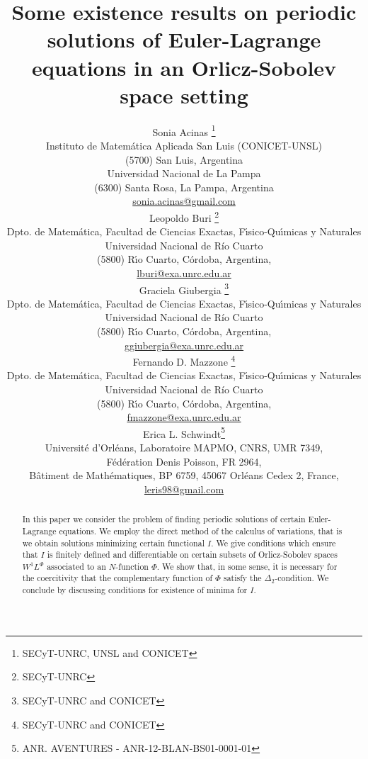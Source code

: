 \documentclass[twoside]{article}
\title{Some existence results on periodic solutions of 
Euler-Lagrange equations in an Orlicz-Sobolev space setting}
\author{Sonia Acinas \thanks{SECyT-UNRC, UNSL and CONICET}\\
Instituto de Matem\'atica Aplicada San Luis (CONICET-UNSL)\\
(5700) San Luis, Argentina\\
Universidad Nacional de La Pampa\\
(6300) Santa Rosa, La Pampa, Argentina\\
\url{sonia.acinas@gmail.com}\\[3mm]
Leopoldo Buri \thanks{SECyT-UNRC}\\
Dpto. de Matem\'atica, Facultad de Ciencias Exactas, F\'{\i}sico-Qu\'{\i}micas y Naturales\\
Universidad Nacional de R\'{i}o Cuarto\\
(5800) R\'{\i}o Cuarto, C\'ordoba, Argentina,\\
\url{lburi@exa.unrc.edu.ar}\\[3mm]
Graciela Giubergia \thanks{SECyT-UNRC and CONICET}\\
Dpto. de Matem\'atica, Facultad de Ciencias Exactas, F\'{\i}sico-Qu\'{\i}micas y Naturales\\
Universidad Nacional de R\'{i}o Cuarto\\
(5800) R\'{\i}o Cuarto, C\'ordoba, Argentina,\\
\url{ggiubergia@exa.unrc.edu.ar}\\[3mm]
Fernando D. Mazzone \thanks{SECyT-UNRC and CONICET}\\
Dpto. de Matem\'atica, Facultad de Ciencias Exactas, F\'{\i}sico-Qu\'{\i}micas y Naturales\\
Universidad Nacional de R\'{i}o Cuarto\\
(5800) R\'{\i}o Cuarto, C\'ordoba, Argentina,\\
\url{fmazzone@exa.unrc.edu.ar}\\[3mm]
Erica L. Schwindt\thanks{ANR. AVENTURES - ANR-12-BLAN-BS01-0001-01}\\
Universit\'{e} d'{O}rl\'{e}ans, Laboratoire MAPMO, CNRS, UMR 7349, \\
F\'ed\'eration Denis Poisson, FR 2964,\\
B\^{a}timent de Math\'{e}matiques, BP 6759, 45067 Orl\'{e}ans Cedex 2, France,\\
\url{leris98@gmail.com}}
\date{}
\theoremstyle{remark}
\begin{document}
\maketitle
%
\begingroup%
    \renewcommand{\thefootnote}{}%
    \endgroup
%
%
%
%

\begin{abstract}
In this paper we consider the problem of finding periodic solutions of certain Euler-Lagrange equations. We employ the direct method of the calculus of variations, that is we obtain solutions minimizing certain functional $I$. We give conditions which ensure that $I$ is finitely defined and differentiable on certain subsets of  Orlicz-Sobolev spaces $W^1L^{\Phi}$ associated to an $N$-function $\Phi$. We show that, in some sense, it is necessary for the coercitivity that  the complementary function of $\Phi$ satisfy the $\Delta_2$-condition.  We conclude by discussing conditions for existence of minima for $I$. 
\end{abstract}




\pagestyle{fancy} \headheight 35pt \fancyhead{} \fancyfoot{}

\fancyfoot[C]{\thepage}  \fancyhead[CO]{\nouppercase{\section}}

\fancyhead[CO]{\nouppercase{\leftmark}}


\end{document}

